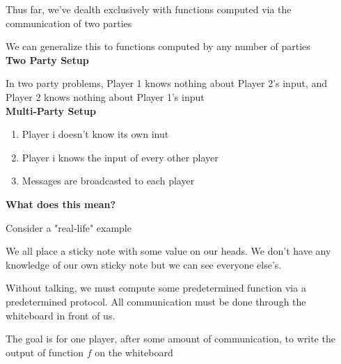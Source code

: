 \documentclass[12pt]{article}
\begin{document}
\maketitle

\par{Thus far, we've dealth exclusively with functions computed via the communication of two parties}
\\

\par{We can generalize this to functions computed by any number of parties}
\\

\textbf{Two Party Setup}
\\

\par{In two party problems, Player 1 knows nothing about Player 2's input, and Player 2 knows nothing about Player 1's
input}
\\

\textbf{Multi-Party Setup}
\\

\begin{enumerate}
  \item Player i doesn't know its own inut
  \item Player i knows the input of every other player
  \item Messages are broadcasted to each player
\end{enumerate}

\textbf{What does this mean?}
\\

\par{Consider a "real-life" example}
\\

\par{We all place a sticky note with some value on our heads. We don't have any knowledge of our own sticky note but
we can see everyone else's.}
\\

\par{Without talking, we must compute some predetermined function via a predetermined protocol. All communication must
be done through the whiteboard in front of us.}
\\

\par{The goal is for one player, after some amount of communication, to write the output of function $f$ on the
whiteboard}
\\
\end{document}
